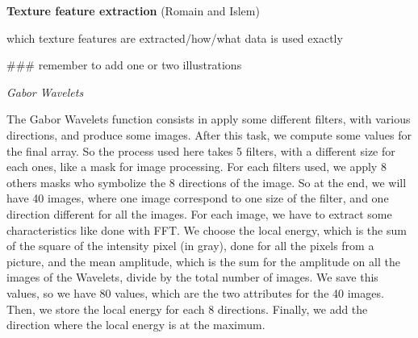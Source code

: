 \textbf{Texture feature extraction} (Romain and Islem)

which texture features are extracted/how/what data is used exactly

### remember to add one or two illustrations 

\textit{Gabor Wavelets}

The Gabor Wavelets function consists in apply some different filters, with various directions, and produce some images. After this task, we compute some values for the final array. So the process used here takes 5 filters, with a different size for each ones, like a mask for image processing. For each filters used, we apply 8 others masks who symbolize the 8 directions of the image. So at the end, we will have 40 images, where one image correspond to one size of the filter, and one direction different for all the images. For each image, we have to extract some characteristics like done with FFT. We choose the local energy, which is the sum of the square of the intensity pixel (in gray), done for all the pixels from a picture, and the mean amplitude, which is the sum for the amplitude on all the images of the Wavelets, divide by the total number of images. We save this values, so we have 80 values, which are the two attributes for the 40 images. Then, we store the local energy for each 8 directions. Finally, we add the direction where the local energy is at the maximum.

    
    
    